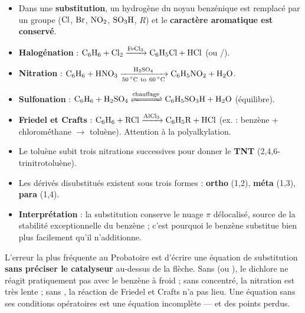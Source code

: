 \documentclass[11pt]{article}
\begin{document}
\begin{aretenir}
\begin{itemize}
\item Dans une \textbf{substitution}, un hydrogène du noyau benzénique est remplacé par un groupe ($\ce{Cl}$, $\ce{Br}$, $\ce{NO2}$, $\ce{SO3H}$, $R$) et le \textbf{caractère aromatique est conservé}.
\item \textbf{Halogénation} : $\ce{C6H6 + Cl2 ->[FeCl3] C6H5Cl + HCl}$ (ou /).
\item \textbf{Nitration} : $\ce{C6H6 + HNO3 ->[\ce{H2SO4}][\SIrange{50}{60}{\celsius}] C6H5NO2 + H2O}$.
\item \textbf{Sulfonation} : $\ce{C6H6 + H2SO4 <=>[\text{chauffage}] C6H5SO3H + H2O}$ (équilibre).
\item \textbf{Friedel et Crafts} : $\ce{C6H6 + RCl ->[AlCl3] C6H5R + HCl}$ (ex. : benzène + chlorométhane $\rightarrow$ toluène). Attention à la polyalkylation.
\item Le toluène subit trois nitrations successives pour donner le \textbf{TNT} (2,4,6-trinitrotoluène).
\item Les dérivés disubstitués existent sous trois formes : \textbf{ortho} (1,2), \textbf{méta} (1,3), \textbf{para} (1,4).
\item \textbf{Interprétation} : la substitution conserve le nuage $\pi$ délocalisé, source de la stabilité exceptionnelle du benzène ; c'est pourquoi le benzène substitue bien plus facilement qu'il n'additionne.
\end{itemize}
\end{aretenir}

\begin{attention}
L'erreur la plus fréquente au Probatoire est d'écrire une équation de substitution \textbf{sans préciser le catalyseur} au-dessus de la flèche. Sans  (ou ), le dichlore ne réagit pratiquement pas avec le benzène à froid ; sans  concentré, la nitration est très lente ; sans , la réaction de Friedel et Crafts n'a pas lieu. Une équation sans ses conditions opératoires est une équation incomplète — et des points perdus.
\end{attention}
\end{document}
